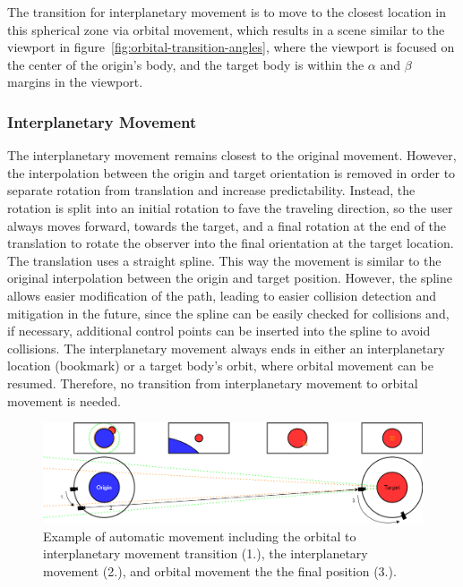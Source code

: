 The transition for interplanetary movement is to move to the closest location in this spherical zone via orbital
movement, which results in a scene similar to the viewport in figure~\ref{fig:orbital-transition-angles}, where the
viewport is focused on the center of the origin's body, and the target body is within the $\alpha$ and $\beta$
margins in the viewport.

\subsubsection{Interplanetary Movement}\label{subsubsec:interplanetary-movement}

The interplanetary movement remains closest to the original movement.
However, the interpolation between the origin and target orientation is removed in order to separate rotation from
translation and increase predictability.
Instead, the rotation is split into an initial rotation to fave the traveling direction, so the user always moves
forward, towards the target, and a final rotation at the end of the translation to rotate the observer into the final
orientation at the target location.
\\
The translation uses a straight spline.
This way the movement is similar to the original interpolation between the origin and target position.
However, the spline allows easier modification of the path, leading to easier collision detection and mitigation in
the future, since the spline can be easily checked for collisions and, if necessary, additional control points can be
inserted into the spline to avoid collisions.
The interplanetary movement always ends in either an interplanetary location (bookmark) or a target body's orbit,
where orbital movement can be resumed.
Therefore, no transition from interplanetary movement to orbital movement is needed.
\\

\begin{figure}[h]
    \centering
    \includegraphics[width=\textwidth]{content/4_3_autoNavigation/img/Orbit2OrbitExample}
    \caption{Example of automatic movement including the orbital to interplanetary movement transition (1.), the
    interplanetary movement (2.), and orbital movement the the final position (3.).}
    \label{fig:orbital-example}
\end{figure}

